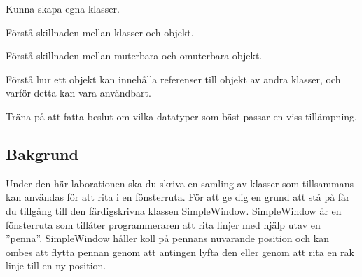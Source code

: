 

\Lab{\LabWeekSIX}

\begin{Goals}
\item Kunna skapa egna klasser.
\item Förstå skillnaden mellan klasser och objekt.
\item Förstå skillnaden mellan muterbara och omuterbara objekt.
\item Förstå hur ett objekt kan innehålla referenser till objekt av andra klasser, och varför detta kan vara användbart.
\item Träna på att fatta beslut om vilka datatyper som bäst passar en viss tillämpning.
\end{Goals}

\begin{Preparations}
\item {}


\end{Preparations}

\subsection{Bakgrund}

Under den här laborationen ska du skriva en samling av klasser som tillsammans kan användas för att rita i en fönsterruta. För att ge dig en grund att stå på får du tillgång till den färdigskrivna klassen SimpleWindow. SimpleWindow är en fönsterruta som tillåter programmeraren att rita linjer med hjälp utav en  ''penna''. SimpleWindow håller koll på pennans nuvarande position och kan ombes att flytta pennan genom att antingen lyfta den eller genom att rita en rak linje till en ny position.


